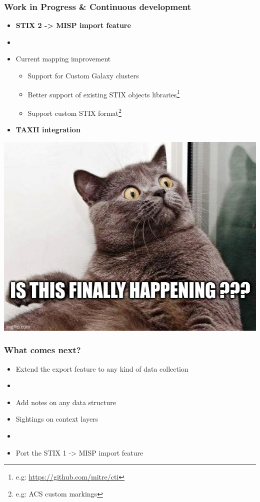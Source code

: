 \begin{frame}
    \frametitle{Work in Progress \& Continuous development}
    \begin{itemize}
        \item {\bf STIX 2 -> MISP import feature}
        \item []
        \item Current mapping improvement
        \begin{itemize}
            \item Support for Custom Galaxy clusters
            \item Better support of existing STIX objects libraries\footnote{e.g: \url{https://github.com/mitre/cti}}
            \item Support custom STIX format\footnote{e.g: ACS custom markings}
        \end{itemize}
    \end{itemize}
    \pause
    \begin{minipage}{0.5\textwidth}
        \begin{itemize}
            \item {\bf TAXII integration}
        \end{itemize}
    \end{minipage}%
    \begin{minipage}{0.5\textwidth}
        \includegraphics[scale=0.2]{images/surprise.jpg}
    \end{minipage}
\end{frame}

\begin{frame}
    \frametitle{What comes next?}
    \begin{itemize}
        \item Extend the export feature to any kind of data collection
        \item []
        \item Add notes on any data structure
        \item Sightings on context layers
        \item []
        \item Port the STIX 1 -> MISP import feature
    \end{itemize}
\end{frame}

